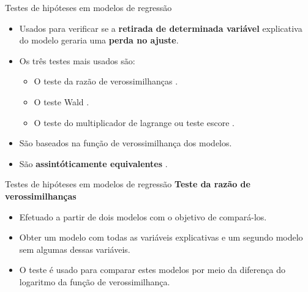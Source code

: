 \documentclass[
  ignorenonframetext,
  serif,
  professionalfont,
  usenames,
  dvipsnames,
  aspectratio = 169]{beamer}
\begin{document}
\begin{frame}{Testes de hipóteses em modelos de regressão}
\protect\hypertarget{testes-de-hipuxf3teses-em-modelos-de-regressuxe3o}{}
\begin{itemize}
    \itemsep 2ex
  
  \item Usados para verificar se a \textbf{retirada de determinada variável} explicativa do modelo geraria uma \textbf{perda no ajuste}.
  
  \item Os três testes mais usados são:

    \begin{itemize}
      \item O teste da razão de verossimilhanças \citep{trv}.
      \item O teste Wald \citep{wald}.
      \item O teste do multiplicador de lagrange ou teste escore \citep{score1,score2,score3}.
    \end{itemize}
  
  \item São baseados na função de verossimilhança dos modelos.
  
  \item São \textbf{assintóticamente equivalentes} \citep{engle}.
  
  \end{itemize}
\end{frame}

\begin{frame}{Testes de hipóteses em modelos de regressão}
\protect\hypertarget{testes-de-hipuxf3teses-em-modelos-de-regressuxe3o-1}{}
\textbf{Teste da razão de verossimilhanças}

\begin{itemize}

  \itemsep 2ex
  
  \item Efetuado a partir de dois modelos com o objetivo de compará-los. 
  \item Obter um modelo com todas as variáveis explicativas e um segundo modelo sem algumas dessas variáveis. 

  \item  O teste é usado para comparar estes modelos por meio da diferença do logaritmo da função de verossimilhança. 

\end{itemize}
\end{frame}
\end{document}
